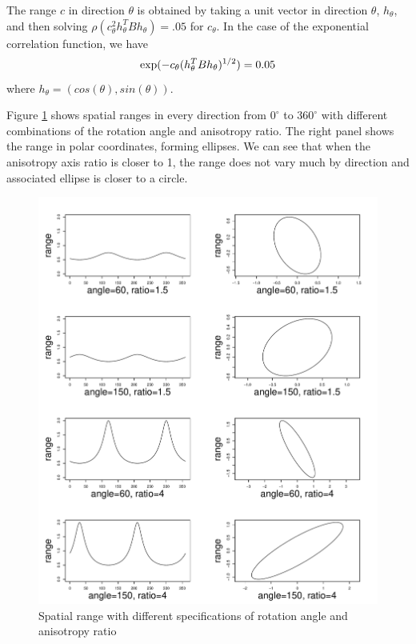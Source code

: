 \documentclass[12pt,twoside]{dukestatscithesis}
\theoremstyle{definition}
\theoremstyle{definition}
\theoremstyle{definition}
\theoremstyle{remark}
\begin{document}
The range \(c\) in direction \(\theta\) is obtained by taking a unit
vector in direction \(\theta\), \(h_{\theta}\), and then solving
\(\rho(c_\theta^2 h_{\theta}^{T}Bh_{\theta})=.05\) for \(c_\theta\). In
the case of the exponential correlation function, we have
\begin{equation}
\text{exp}(-c_\theta (h_\theta^{T}Bh_\theta)^{1/2}) = 0.05 \\
\end{equation}
where \(h_\theta = (cos(\theta), sin(\theta))\).

Figure \ref{fig:rangessim} shows spatial ranges in every direction from
\(0^\circ\) to \(360^\circ\) with different combinations of the rotation
angle and anisotropy ratio. The right panel shows the range in polar
coordinates, forming ellipses. We can see that when the anisotropy axis
ratio is closer to 1, the range does not vary much by direction and
associated ellipse is closer to a circle.
\begin{figure}
\includegraphics[scale=0.6]{figure/ranges_sim} \caption{Spatial range with different specifications of rotation angle and anisotropy ratio}\label{fig:rangessim}
\end{figure}
\end{document}
